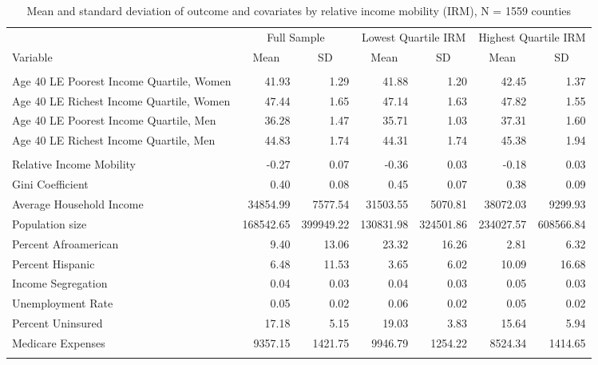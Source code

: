 \begin{table}[htp]
\centering
\caption{Mean and standard deviation of outcome and covariates
                 \newline by relative income mobility (IRM), N = 1559 counties} 
\label{descriptives}
\begingroup\scriptsize
\begin{tabular}{lrrrrrr}
  \hline
\addlinespace
& \multicolumn{2}{c}{Full Sample} & \multicolumn{2}{c}{Lowest Quartile IRM} & \multicolumn{2}{c}{Highest Quartile IRM}  \\
Variable & \multicolumn{1}{c}{Mean} & \multicolumn{1}{c}{SD} & \multicolumn{1}{c}{Mean} & \multicolumn{1}{c}{SD} & \multicolumn{1}{c}{Mean} & \multicolumn{1}{c}{SD} \\
\addlinespace
 \hline
  \addlinespace
\multicolumn{7}{l}{\textit{Outcome}} \\
\addlinespace
Age 40 LE Poorest Income Quartile, Women & 41.93 & 1.29 & 41.88 & 1.20 & 42.45 & 1.37 \\ 
  Age 40 LE Richest Income Quartile, Women & 47.44 & 1.65 & 47.14 & 1.63 & 47.82 & 1.55 \\ 
  Age 40 LE Poorest Income Quartile, Men & 36.28 & 1.47 & 35.71 & 1.03 & 37.31 & 1.60 \\ 
  Age 40 LE Richest Income Quartile, Men & 44.83 & 1.74 & 44.31 & 1.74 & 45.38 & 1.94 \\ 
   \addlinespace
\multicolumn{7}{l}{\textit{Covariates}} \\
\addlinespace
Relative Income Mobility & -0.27 & 0.07 & -0.36 & 0.03 & -0.18 & 0.03 \\ 
  Gini Coefficient & 0.40 & 0.08 & 0.45 & 0.07 & 0.38 & 0.09 \\ 
  Average Household Income & 34854.99 & 7577.54 & 31503.55 & 5070.81 & 38072.03 & 9299.93 \\ 
  Population size & 168542.65 & 399949.22 & 130831.98 & 324501.86 & 234027.57 & 608566.84 \\ 
  Percent Afroamerican & 9.40 & 13.06 & 23.32 & 16.26 & 2.81 & 6.32 \\ 
  Percent Hispanic & 6.48 & 11.53 & 3.65 & 6.02 & 10.09 & 16.68 \\ 
  Income Segregation & 0.04 & 0.03 & 0.04 & 0.03 & 0.05 & 0.03 \\ 
  Unemployment Rate & 0.05 & 0.02 & 0.06 & 0.02 & 0.05 & 0.02 \\ 
  Percent Uninsured & 17.18 & 5.15 & 19.03 & 3.83 & 15.64 & 5.94 \\ 
  Medicare Expenses & 9357.15 & 1421.75 & 9946.79 & 1254.22 & 8524.34 & 1414.65 \\ 
   \addlinespace
\hline
\addlinespace
\end{tabular}
\endgroup
\end{table}
